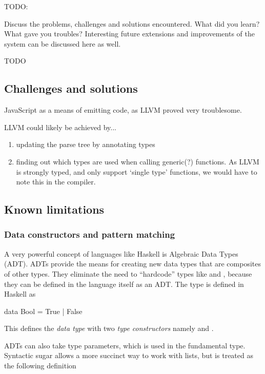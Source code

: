 

TODO:

Discuss the problems, challenges and solutions encountered. What did you learn? What gave you troubles? Interesting future extensions and improvements of the system can be discussed here as well.


TODO

\subsection{Challenges and solutions}
JavaScript as a means of emitting code, as LLVM proved very troublesome.

LLVM could likely be achieved by...
\begin{enumerate}
  \item updating the parse tree by annotating types
  \item finding out which types are used when calling generic(?) functions. As LLVM is strongly typed, and only support `single type' functions, we would have to note this in the compiler.
\end{enumerate}



\subsection{Known limitations}
\subsubsection{Data constructors and pattern matching}
A very powerful concept of languages like Haskell is Algebraic Data Types (ADT). ADTs provide the means for creating new data types that are composites of other types. They eliminate the need to ``hardcode'' types like  and , because they can be defined in the language itself as an ADT. The  type is defined in Haskell as

\begin{haskell}
data Bool = True | False
\end{haskell}

This defines the \emph{data type}  with two \emph{type constructors} namely  and .

ADTs can also take type parameters, which is used in the fundamental  type. Syntactic sugar allows a more succinct way to work with lists, but is treated as the following definition

